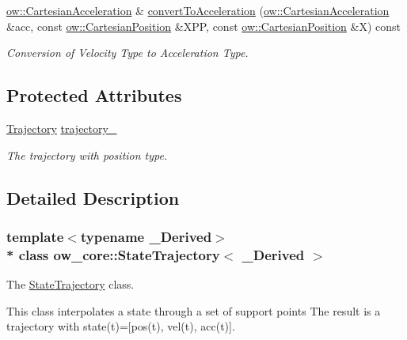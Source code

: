 \begin{DoxyCompactItemize}
\hyperlink{classow__core_1_1CartesianAcceleration}{ow\+::\+Cartesian\+Acceleration} \& \hyperlink{classow__core_1_1StateTrajectory_a65a0991d3ce16e674d596108eaa8cd67}{convert\+To\+Acceleration} (\hyperlink{classow__core_1_1CartesianAcceleration}{ow\+::\+Cartesian\+Acceleration} \&acc, const \hyperlink{classow__core_1_1CartesianPosition}{ow\+::\+Cartesian\+Position} \&X\+PP, const \hyperlink{classow__core_1_1CartesianPosition}{ow\+::\+Cartesian\+Position} \&X) const 
\begin{DoxyCompactList}\small\item\em Conversion of Velocity Type to Acceleration Type. \end{DoxyCompactList}\end{DoxyCompactItemize}
\subsection*{Protected Attributes}
\begin{DoxyCompactItemize}
\item 
\hyperlink{classow__core_1_1PolynomialTrajectory}{Trajectory} \hyperlink{classow__core_1_1StateTrajectory_a2d2a63076b1f9201e61ca37ccd05a794}{trajectory\+\_\+}\hypertarget{classow__core_1_1StateTrajectory_a2d2a63076b1f9201e61ca37ccd05a794}{}\label{classow__core_1_1StateTrajectory_a2d2a63076b1f9201e61ca37ccd05a794}

\begin{DoxyCompactList}\small\item\em The trajectory with position type. \end{DoxyCompactList}\end{DoxyCompactItemize}


\subsection{Detailed Description}
\subsubsection*{template$<$typename \+\_\+\+Derived$>$\\*
class ow\+\_\+core\+::\+State\+Trajectory$<$ \+\_\+\+Derived $>$}

The \hyperlink{classow__core_1_1StateTrajectory}{State\+Trajectory} class. 

This class interpolates a state through a set of support points The result is a trajectory with state(t)=\mbox{[}pos(t), vel(t), acc(t)\mbox{]}.

